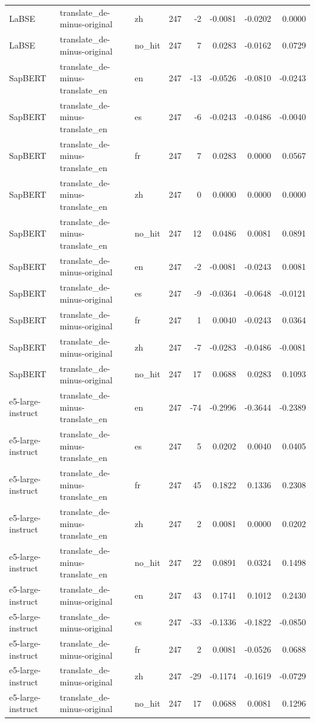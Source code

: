 \begin{tabular}{lllrrrrr}
LaBSE & translate\_de-minus-original & zh & 247 & -2 & -0.0081 & -0.0202 & 0.0000 \\
LaBSE & translate\_de-minus-original & no\_hit & 247 & 7 & 0.0283 & -0.0162 & 0.0729 \\
SapBERT & translate\_de-minus-translate\_en & en & 247 & -13 & -0.0526 & -0.0810 & -0.0243 \\
SapBERT & translate\_de-minus-translate\_en & es & 247 & -6 & -0.0243 & -0.0486 & -0.0040 \\
SapBERT & translate\_de-minus-translate\_en & fr & 247 & 7 & 0.0283 & 0.0000 & 0.0567 \\
SapBERT & translate\_de-minus-translate\_en & zh & 247 & 0 & 0.0000 & 0.0000 & 0.0000 \\
SapBERT & translate\_de-minus-translate\_en & no\_hit & 247 & 12 & 0.0486 & 0.0081 & 0.0891 \\
SapBERT & translate\_de-minus-original & en & 247 & -2 & -0.0081 & -0.0243 & 0.0081 \\
SapBERT & translate\_de-minus-original & es & 247 & -9 & -0.0364 & -0.0648 & -0.0121 \\
SapBERT & translate\_de-minus-original & fr & 247 & 1 & 0.0040 & -0.0243 & 0.0364 \\
SapBERT & translate\_de-minus-original & zh & 247 & -7 & -0.0283 & -0.0486 & -0.0081 \\
SapBERT & translate\_de-minus-original & no\_hit & 247 & 17 & 0.0688 & 0.0283 & 0.1093 \\
e5-large-instruct & translate\_de-minus-translate\_en & en & 247 & -74 & -0.2996 & -0.3644 & -0.2389 \\
e5-large-instruct & translate\_de-minus-translate\_en & es & 247 & 5 & 0.0202 & 0.0040 & 0.0405 \\
e5-large-instruct & translate\_de-minus-translate\_en & fr & 247 & 45 & 0.1822 & 0.1336 & 0.2308 \\
e5-large-instruct & translate\_de-minus-translate\_en & zh & 247 & 2 & 0.0081 & 0.0000 & 0.0202 \\
e5-large-instruct & translate\_de-minus-translate\_en & no\_hit & 247 & 22 & 0.0891 & 0.0324 & 0.1498 \\
e5-large-instruct & translate\_de-minus-original & en & 247 & 43 & 0.1741 & 0.1012 & 0.2430 \\
e5-large-instruct & translate\_de-minus-original & es & 247 & -33 & -0.1336 & -0.1822 & -0.0850 \\
e5-large-instruct & translate\_de-minus-original & fr & 247 & 2 & 0.0081 & -0.0526 & 0.0688 \\
e5-large-instruct & translate\_de-minus-original & zh & 247 & -29 & -0.1174 & -0.1619 & -0.0729 \\
e5-large-instruct & translate\_de-minus-original & no\_hit & 247 & 17 & 0.0688 & 0.0081 & 0.1296 \\
\bottomrule
\end{tabular}
